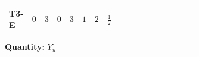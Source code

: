 \documentclass[8pt]{article}
\begin{document}
\begin{landscape}
\begin{longtable}{@{}llcccccc >{\raggedright\arraybackslash}p{0.21\linewidth} >{\raggedright\arraybackslash}p{0.21\linewidth} >{\raggedright\arraybackslash}p{0.21\linewidth}@{}}
\midrule
T3-E & $0$ & $3$ & $0$ & $3$ & $1$ & $2$ & $\frac{1}{2}$ & \scriptsize\adjustbox{max width=\linewidth}{$\begin{gathered} 3 \operatorname{Tr}\!\left({Y_d}\,\left({Y_d}\right)^{\dagger}\right) \left({Y_u}\right)_{ij}\end{gathered}$} & \scriptsize\adjustbox{max width=\linewidth}{$\begin{gathered} +\operatorname{Tr}\!\left({Y_e}\,\left({Y_e}\right)^{\dagger}\right) \left({Y_u}\right)_{ij}\end{gathered}$} & \scriptsize\adjustbox{max width=\linewidth}{$\begin{gathered} +3 \operatorname{Tr}\!\left({Y_u}\,\left({Y_u}\right)^{\dagger}\right) \left({Y_u}\right)_{ij}\end{gathered}$} \\
\midrule
\bottomrule
\end{longtable}
\clearpage
\noindent\textbf{Quantity: }$Y_u$\par\smallskip

\end{landscape}
\end{document}
